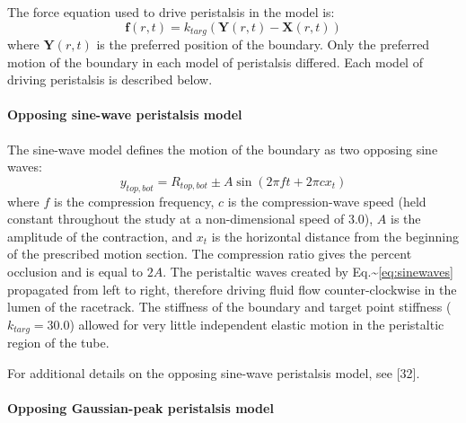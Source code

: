 \documentclass[
]{article}
\begin{document}
The force equation used to drive peristalsis in the model is:
\begin{equation}
\mathbf{f}(r,t) = k_{targ}(\mathbf{Y}(r,t) - \mathbf{X}(r,t))
\label{eq:f}
\end{equation} where \(\mathbf{Y}(r,t)\) is the preferred position of
the boundary. Only the preferred motion of the boundary in each model of
peristalsis differed. Each model of driving peristalsis is described
below.

\hypertarget{opposing-sine-wave-peristalsis-model}{%
\paragraph{Opposing sine-wave peristalsis
model}\label{opposing-sine-wave-peristalsis-model}}

The sine-wave model defines the motion of the boundary as two opposing
sine waves: \begin{equation}
y_{top,bot} = R_{top,bot} \pm A \sin(2\pi f t+ 2\pi cx_t)
\label{eq:sinewaves}
\end{equation} where \(f\) is the compression frequency, \(c\) is the
compression-wave speed (held constant throughout the study at a
non-dimensional speed of 3.0), \(A\) is the amplitude of the
contraction, and \(x_t\) is the horizontal distance from the beginning
of the prescribed motion section. The compression ratio gives the
percent occlusion and is equal to \(2A\). The peristaltic waves created
by Eq.\textasciitilde{}\ref{eq:sinewaves} propagated from left to right,
therefore driving fluid flow counter-clockwise in the lumen of the
racetrack. The stiffness of the boundary and target point stiffness
(\(k_{targ}=30.0\)) allowed for very little independent elastic motion
in the peristaltic region of the tube.

For additional details on the opposing sine-wave peristalsis model, see
{[}32{]}.

\hypertarget{opposing-gaussian-peak-peristalsis-model}{%
\paragraph{Opposing Gaussian-peak peristalsis
model}\label{opposing-gaussian-peak-peristalsis-model}}
\end{document}
